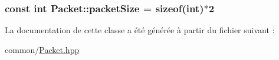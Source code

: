 \subsubsection[{packet\+Size}]{\setlength{\rightskip}{0pt plus 5cm}const int Packet\+::packet\+Size = sizeof(int)$\ast$2\hspace{0.3cm}{\ttfamily [static]}}\label{classPacket_a4d3ec46364b14d6f59e550920ec9a78a}


La documentation de cette classe a été générée à partir du fichier suivant \+:\begin{DoxyCompactItemize}
\item 
common/\hyperlink{Packet_8hpp}{Packet.\+hpp}\end{DoxyCompactItemize}
